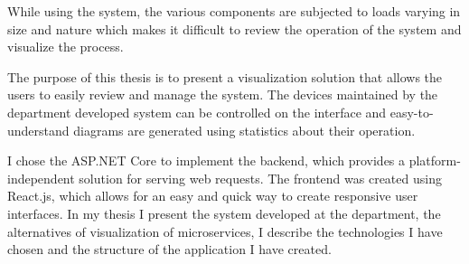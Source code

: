 While using the system, the various components are subjected to loads varying in size and nature
which makes it difficult to review the operation of the system and visualize the process.

The purpose of this thesis is to present a visualization solution that allows the users to easily review
and manage the system. The devices maintained by the department developed system can be controlled on the interface
and easy-to-understand diagrams are generated using statistics about their operation.

I chose the ASP.NET Core to implement the backend, which provides a platform-independent solution for serving web requests.
The frontend was created using React.js, which allows for an easy and quick way to create responsive user interfaces.
In my thesis I present the system developed at the department, the alternatives of visualization of microservices,
I describe the technologies I have chosen and the structure of the application I have created.

\vfill
\selectthesislanguage

\setcounter{romanPage}{\value{page}}
